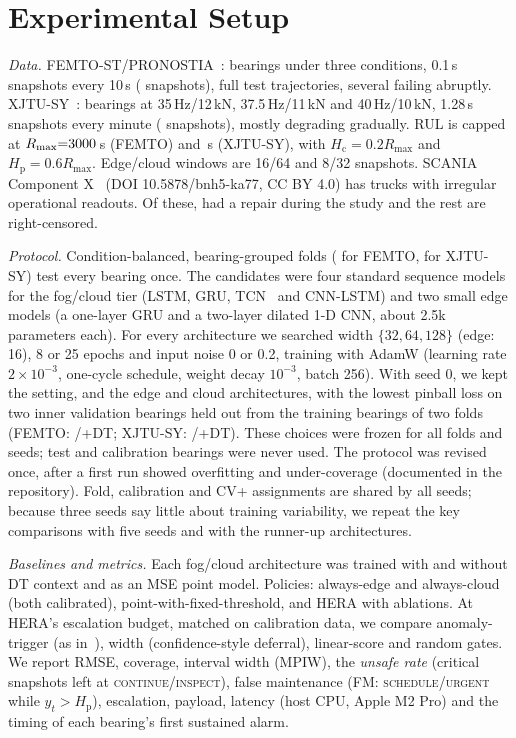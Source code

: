 \documentclass[conference]{IEEEtran}
\newcommand{\Hc}{H_{\mathrm{c}}}
\newcommand{\Hp}{H_{\mathrm{p}}}
\begin{document}
\section{Experimental Setup}
\textit{Data.} FEMTO-ST/PRONOSTIA~\cite{nectoux2012pronostia}: \feNBearings{} bearings under three conditions, 0.1\,s snapshots every 10\,s (\feNSnap{} snapshots), full test trajectories, several failing abruptly. XJTU-SY~\cite{wang2020xjtu}: \xjNBearings{} bearings at 35\,Hz/12\,kN, 37.5\,Hz/11\,kN and 40\,Hz/10\,kN, 1.28\,s snapshots every minute (\xjNSnap{} snapshots), mostly degrading gradually. RUL is capped at $R_{\max}{=}3000$\,s (FEMTO) and \xjRmax\,s (XJTU-SY), with $\Hc{=}0.2R_{\max}$ and $\Hp{=}0.6R_{\max}$. Edge/cloud windows are 16/64 and 8/32 snapshots. SCANIA Component X~\cite{kharazian2025scania} (DOI 10.5878/bnh5-ka77, CC BY 4.0) has \flN{} trucks with irregular operational readouts. Of these, \flNf{} had a repair during the study and the rest are right-censored.

\textit{Protocol.} Condition-balanced, bearing-grouped folds (\feNFolds{} for FEMTO, \xjNFolds{} for XJTU-SY) test every bearing once. The candidates were four standard sequence models for the fog/cloud tier (LSTM, GRU, TCN~\cite{bai2018tcn} and CNN-LSTM) and two small edge models (a one-layer GRU and a two-layer dilated 1-D CNN, about 2.5k parameters each). For every architecture we searched width $\{32,64,128\}$ (edge: 16), 8 or 25 epochs and input noise 0 or 0.2, training with AdamW (learning rate $2{\times}10^{-3}$, one-cycle schedule, weight decay $10^{-3}$, batch 256). With seed 0, we kept the setting, and the edge and cloud architectures, with the lowest pinball loss on two inner validation bearings held out from the training bearings of two folds (FEMTO: \feEdgeModel/\feCloudModel+DT; XJTU-SY: \xjEdgeModel/\xjCloudModel+DT). These choices were frozen for all folds and seeds; test and calibration bearings were never used. The protocol was revised once, after a first run showed overfitting and under-coverage (documented in the repository). Fold, calibration and CV+ assignments are shared by all seeds; because three seeds say little about training variability, we repeat the key comparisons with five seeds and with the runner-up architectures.

\textit{Baselines and metrics.} Each fog/cloud architecture was trained with and without DT context and as an MSE point model. Policies: always-edge and always-cloud (both calibrated), point-with-fixed-threshold, and HERA with ablations. At HERA's escalation budget, matched on calibration data, we compare anomaly-trigger (as in~\cite{saleh2026hama}), width (confidence-style deferral), linear-score and random gates. We report RMSE, coverage, interval width (MPIW), the \emph{unsafe rate} (critical snapshots left at \textsc{continue}/\textsc{inspect}), false maintenance (FM: \textsc{schedule}/\textsc{urgent} while $y_t>\Hp$), escalation, payload, latency (host CPU, Apple M2 Pro) and the timing of each bearing's first sustained alarm.
\end{document}
